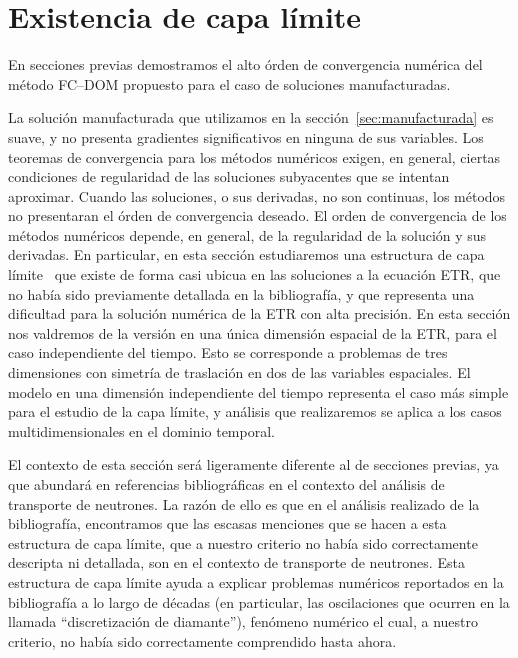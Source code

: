 \section{Existencia de capa límite}
\label{sec:blayer}
En secciones previas demostramos el alto órden de convergencia numérica 
del método FC--DOM propuesto para el caso de soluciones manufacturadas.

La solución manufacturada que utilizamos en la sección~\ref{sec:manufacturada}
es suave, y no presenta gradientes significativos en ninguna de sus variables. 
Los teoremas de convergencia para los métodos numéricos exigen, en general,  
ciertas condiciones de regularidad de las soluciones subyacentes que se intentan aproximar. Cuando las soluciones, 
o sus derivadas, no son continuas, los métodos no presentaran el órden 
de convergencia deseado. El orden de convergencia de los métodos numéricos 
depende, en general, de la regularidad de la solución y sus derivadas. En particular, en esta sección estudiaremos 
una estructura de capa límite~\cite{Gaggioli2021} que existe de forma casi ubicua en las soluciones 
a la ecuación ETR, que no había sido previamente detallada en la bibliografía, 
y que representa una dificultad para la solución numérica de la ETR con alta precisión.
En esta sección nos valdremos de la versión en una única dimensión espacial de la ETR, 
para el caso independiente del tiempo. 
Esto se corresponde a problemas de tres dimensiones con simetría de traslación en dos 
de las variables espaciales. El modelo en una dimensión independiente del tiempo representa el caso 
más simple para el estudio de la capa límite, y análisis que realizaremos
se aplica a los casos multidimensionales en el dominio temporal. 

El contexto de esta sección será ligeramente diferente al de secciones previas, 
ya que abundará en referencias bibliográficas en el contexto 
del análisis de transporte de neutrones. La razón de ello 
es que en el análisis realizado de la bibliografía, encontramos 
que las escasas menciones que se hacen a esta estructura de capa límite, 
que a nuestro criterio no había sido correctamente descripta ni detallada, 
son en el contexto de transporte de neutrones. Esta estructura 
de capa límite ayuda a explicar problemas numéricos reportados en la bibliografía 
a lo largo de décadas
(en particular, las oscilaciones que ocurren en la llamada 
``discretización de diamante''), fenómeno numérico el cual, a nuestro 
criterio, no había sido correctamente comprendido hasta ahora.

